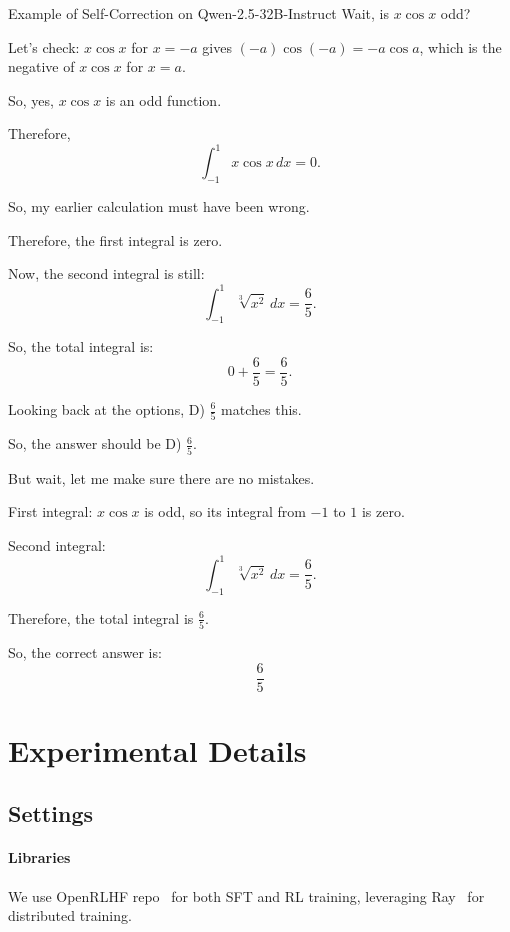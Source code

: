 \begin{promptbox}{Example of Self-Correction on Qwen-2.5-32B-Instruct}
Wait, is $x \cos x$ odd?

Let's check: $x \cos x$ for $x = -a$ gives $(-a) \cos(-a) = -a \cos a$, which is the negative of $x \cos x$ for $x = a$.

So, yes, $x \cos x$ is an odd function.

Therefore, 
\[
\int_{-1}^{1} x \cos x \,dx = 0.
\]

So, my earlier calculation must have been wrong.

Therefore, the first integral is zero.

Now, the second integral is still:
\[
\int_{-1}^{1} \sqrt[3]{x^2} \,dx = \frac{6}{5}.
\]

So, the total integral is:
\[
0 + \frac{6}{5} = \frac{6}{5}.
\]

Looking back at the options, D) $\frac{6}{5}$ matches this.

So, the answer should be D) $\frac{6}{5}$.

But wait, let me make sure there are no mistakes.

First integral: $x \cos x$ is odd, so its integral from $-1$ to $1$ is zero.

Second integral: 
\[
\int_{-1}^{1} \sqrt[3]{x^2} \,dx = \frac{6}{5}.
\]

Therefore, the total integral is $\frac{6}{5}$.

So, the correct answer is:
\[
\boxed{\frac{6}{5}}
\]
\end{promptbox}






\section{Experimental Details}\label{sec:app-exp-details}

\subsection{Settings}
\label{sec:exp-settings}
\paragraph{Libraries}
We use OpenRLHF repo~\cite{hu2024openrlhf} for both SFT and RL training, leveraging Ray~\cite{moritz2018ray} for distributed training.

